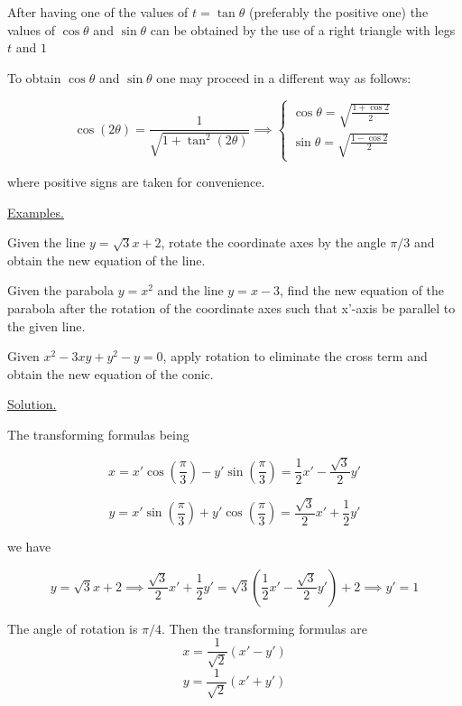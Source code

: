 \documentclass[11pt]{amsbook}
\begin{document}
    
    After having one of the values of $t = \tan \theta$ (preferably the positive one) the values of $\cos \theta$ and $\sin \theta$ can be obtained by the use of a right triangle with legs $t$ and $1$ \par
    
    To obtain $\cos\theta$ and $\sin\theta$ one may proceed in a different way as follows:
    
    
    \[\cos(2\theta) = \frac{1}{\sqrt{1 + \tan^2(2\theta)}} \implies \begin{cases} 
    
        \cos\theta = \sqrt{\frac{1 + \cos2}{2}} \\
        \sin\theta = \sqrt{\frac{1 - \cos2}{2}}
    
    \end{cases} \]
    
    
    \noindent where positive signs are taken for convenience. \par
    \underline{Examples.} \par
        
    \begin{hEnumerateArabic}
        \item Given the line $y = \sqrt{3}x + 2$, rotate the coordinate axes by the angle $\pi/3$ and obtain the new equation of the line.
        \item Given the parabola $y = x^2$ and the line $y = x - 3$, find the new equation of the parabola after the rotation of the coordinate axes such that x'-axis be parallel to the given line.
        \item Given $x^2 - 3xy + y^2 - y = 0$, apply rotation to eliminate the cross term and obtain the new equation of the conic.\\
    \end{hEnumerateArabic}
    
    \underline{Solution.} \par

    \begin{hEnumerateArabic}
        \item The transforming formulas being 
        
        \[x = x'\cos(\frac{\pi}{3}) - y'\sin(\frac{\pi}{3}) = \frac{1}{2}x' - \frac{\sqrt{3}}{2}y' \]
        
        \[y = x'\sin(\frac{\pi}{3}) + y'\cos(\frac{\pi}{3}) = \frac{\sqrt{3}}{2}x' +  \frac{1}{2}y' \]
        
        \noindent we have
        
        \[y  = \sqrt{3}x + 2 \implies \frac{\sqrt{3}}{2}x' + \frac{1}{2}y' = \sqrt{3}(\frac{1}{2}x' - \frac{\sqrt{3}}{2}y') + 2 \implies y' = 1 \]
        
        \item The angle of rotation is $\pi/4$. Then the transforming formulas are 
        \[x = \frac{1}{\sqrt{2}} (x' - y') \]
        \[y = \frac{1}{\sqrt{2}} (x' + y') \]
        
    \end{hEnumerateArabic}
\end{document}
